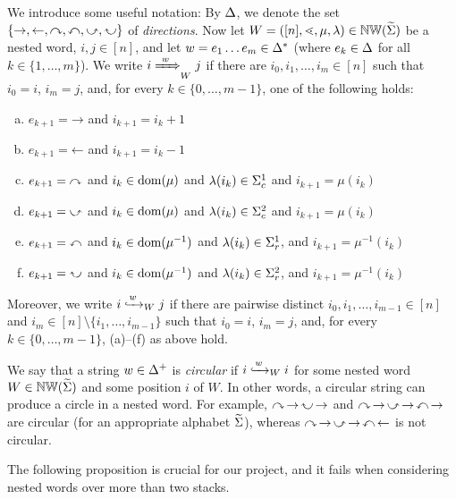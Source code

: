 \documentclass{LMCS}
\begin{document}
We introduce some useful notation: By $\Dir$, we denote the set
$\{\rightarrow,\leftarrow,\rightone,\leftone,\righttwo,\lefttwo\}$ of
\emph{directions}. Now let $W = ([n],\succord,\mu,\lambda) \in \NW(\crSigma)$
be a nested word, $i,j \in [n]$, and let $w=e_1 \ldots e_m \in \Dir^\ast$
(where $e_k \in \Dir$ for all $k \in \{1,\ldots,m\}$).
We write $\Wleadstoeq{W}{w}{i}{j}$ if there are $i_0,i_1,\ldots,i_m \in [n]$
such that $i_0 = i$, $i_m = j$, and, for every $k \in \{0,\ldots,m-1\}$, one
of the following holds:
\begin{enumerate}[(a)]
\item $e_{k+1} = \mathord{\rightarrow}$ and $i_{k+1} = i_k + 1$
\item $e_{k+1} = \mathord{\leftarrow}$ and $i_{k+1} = i_k - 1$
\item $e_{k+1} = \mathord{\rightone}$ and $i_k \in \dom(\mu)$ and $\lambda(i_k) \in
  \cSigma^1$ and $i_{k+1} = \mu(i_k)$
\item $e_{k+1} = \mathord{\righttwo}$ and $i_k \in \dom(\mu)$ and $\lambda(i_k) \in
  \cSigma^2$ and $i_{k+1} = \mu(i_k)$
\item $e_{k+1} = \mathord{\leftone}$ and $i_k \in \dom(\mu^{-1})$ and
  $\lambda(i_k) \in \rSigma^1$, and $i_{k+1} = \mu^{-1}(i_k)$
\item $e_{k+1} = \mathord{\lefttwo}$ and $i_k \in \dom(\mu^{-1})$ and
  $\lambda(i_k) \in \rSigma^2$, and $i_{k+1} = \mu^{-1}(i_k)$
\end{enumerate}
Moreover, we write $\Wleadsto{W}{w}{i}{j}$ if there are pairwise distinct
$i_0,i_1,\ldots,i_{m-1} \in [n]$ and $i_m \in [n] \setminus
\{i_1,\ldots,i_{m-1}\}$ such that $i_0 = i$, $i_m = j$, and, for every $k \in
\{0,\ldots,m-1\}$, (a)--(f) as above hold.

We say that a string $w \in \Dir^+$ is \emph{circular} if
$\Wleadsto{W}{w}{i}{i}$ for some nested word $W \in \NW(\crSigma)$ and some
position $i$ of $W$. In other words, a circular string can produce a circle in
a nested word. For example, $\rightone ~\! \rightarrow ~\! \lefttwo ~\!
\rightarrow$ and $\rightone ~\! \rightarrow ~\! \righttwo ~\! \rightarrow ~\!
\leftone ~\! \rightarrow$ are circular (for an appropriate alphabet
$\crSigma$), whereas $\rightone ~\! \rightarrow ~\! \righttwo ~\! \rightarrow
~\! \leftone ~\! \leftarrow$ is not circular.

The following proposition is crucial for our project, and it fails when
considering nested words over more than two stacks.
\end{document}
